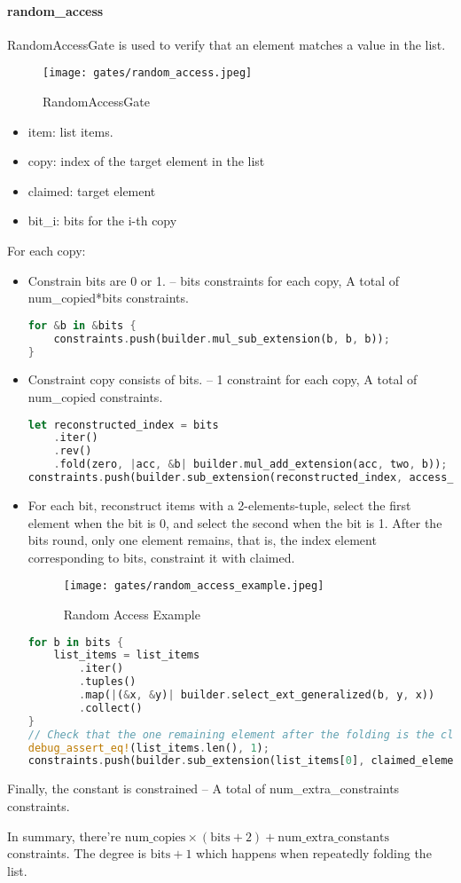 \paragraph{random\_access}

RandomAccessGate is used to verify that an element matches a value in the list.

\begin{figure}[!ht]
    \centering
    \texttt{[image: gates/random\_access.jpeg]}
    \caption{RandomAccessGate}
    \label{fig:random-access}
\end{figure}

\begin{itemize}
    \item item: list items.
    \item copy: index of the target element in the list
    \item claimed: target element
    \item bit\_i: bits for the i-th copy
\end{itemize}

For each copy:
\begin{itemize}
    \item Constrain bits are 0 or 1. -- bits constraints for each copy, A total of num\_copied*bits constraints.
    \begin{lstlisting}[language=rust]
for &b in &bits {
    constraints.push(builder.mul_sub_extension(b, b, b));
}
    \end{lstlisting}
    \item Constraint copy consists of bits. -- 1 constraint for each copy, A total of num\_copied constraints.
    \begin{lstlisting}[language=rust]
let reconstructed_index = bits
    .iter()
    .rev()
    .fold(zero, |acc, &b| builder.mul_add_extension(acc, two, b));
constraints.push(builder.sub_extension(reconstructed_index, access_index));
    \end{lstlisting}
    \item For each bit, reconstruct items with a 2-elements-tuple, select the first element when the bit is 0, and select the second when the bit is 1.
    After the bits round, only one element remains, that is, the index element corresponding to bits, constraint it with claimed.
    \begin{figure}[!ht]
        \centering
        \texttt{[image: gates/random\_access\_example.jpeg]}
        \caption{Random Access Example}
        \label{fig:random-access-example}
    \end{figure}
    \begin{lstlisting}[language=rust]
for b in bits {
    list_items = list_items
        .iter()
        .tuples()
        .map(|(&x, &y)| builder.select_ext_generalized(b, y, x))
        .collect()
}
// Check that the one remaining element after the folding is the claimed element.
debug_assert_eq!(list_items.len(), 1);
constraints.push(builder.sub_extension(list_items[0], claimed_element));
    \end{lstlisting}
\end{itemize}

Finally, the constant is constrained -- A total of num\_extra\_constraints constraints.

In summary, there're $\text{num\_copies} \times (\text{bits} + 2) + \text{num\_extra\_constants}$ constraints. The degree is $\text{bits} + 1$ which happens when repeatedly folding the list. 
